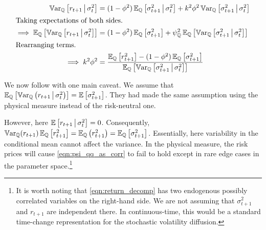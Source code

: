 \documentclass[11pt, letterpaper, twoside, final]{article}
\begin{document}
\begin{align}
    \Var_{\QQ}\left[r_{t+1} \mvert \sigma^2_t\right]  &= (1 - \phi^2) \E_{\QQ}\left[\sigma^2_{t+1} \mvert
    \sigma^2_t \right] + k^2 \phi^2 \Var_{\QQ}\left[\sigma^2_{t+1} \mvert \sigma^2_t \right]  \\
%
    \intertext{Taking expectations of both sides.}
%
    \implies \E_{\QQ}\left[\Var_{\QQ}\left[r_{t+1} \mvert \sigma^2_t\right]\right]  &= (1 - \phi^2)
    \E_{\QQ}\left[\sigma^2_{t+1} \right] + \psi_{\QQ}^2 \E_{\QQ}\left[\Var_{\QQ}\left[\sigma^2_{t+1} \mvert
    \sigma^2_t \right]\right]  \\
%
    \intertext{Rearranging terms.}
%
    \implies k^2 \phi^2 &= \frac{\E_{\QQ}\left[r^2_{t+1} \right] -  (1 - \phi^2) \E_{\QQ}\left[\sigma^2_{t+1}
    \right]}{\E_{\QQ}\left[\Var_{\QQ}\left[\sigma^2_{t+1} \mvert \sigma^2_t \right]\right]}
    \label{eqn:psi_qq_as_corr}
\end{align}

We now follow \textcite{khrapov2016affine} with one main caveat. 
We assume that $\operatorname{\mathbb{E}}_{\mathbb{Q}}\left[\operatorname{\mathbb{V}ar}_{\mathbb{Q}}\left(r_{t+1} \,\middle\vert\, \sigma^2_t\right)\right] =
\operatorname{\mathbb{E}}\left[\sigma^2_{t+1}\right]$.
They had made the same assumption using the physical measure instead of the risk-neutral one.


However, here $\operatorname{\mathbb{E}}\left[r_{t+1} \,\middle\vert\, \sigma^2_{t}\right] = 0$.
Consequently, $\operatorname{\mathbb{V}ar}_{\mathbb{Q}}(r_{t+1}) \operatorname{\mathbb{E}}_{\mathbb{Q}}\left[r_{t+1}^2\right]  = \operatorname{\mathbb{E}}_{\mathbb{Q}}\left(r^2_{t+1}\right) =
\operatorname{\mathbb{E}}_{\mathbb{Q}}\left[\sigma^2_{t+1}\right]$.
Essentially, here variability in the conditional mean cannot affect the variance.
In the physical measure, the risk prices will cause  \cref{eqn:psi_qq_as_corr} to fail to hold except in rare edge
cases in the parameter space.\footnote{It is worth noting that  \cref{eqn:return_decomp} has two endogenous
    possibly correlated variables on the right-hand side. We are not assuming that $\sigma^2_{t+1}$ and $r_{t+1}$
    are independent there. In continuous-time, this would be a standard time-change representation for the
stochastic volatility diffusion.}
\end{document}

